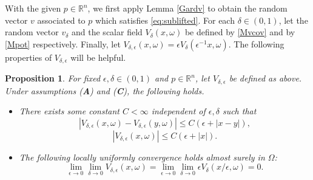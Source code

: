 \documentclass[11pt,reqno]{amsart}
\newtheorem{prop}[thm]{Proposition}
\theoremstyle{definition}
\theoremstyle{remark}
\numberwithin{equation}{section}
\newcommand{\eps}{\epsilon}
\newcommand{\R}{{\mathbb{R}}}
\begin{document}
With the given $p\in \R^n$, we first apply Lemma \ref{Gardv} to obtain the random vector $v$ associated to $p$ which satisfies \eqref{eq:sublifted}. For each $\delta \in (0,1)$, let the random vector $v_\delta$ and the scalar field $V_\delta(x,\omega)$ be defined by \eqref{Mvcov} and by \eqref{Mpot} respectively. Finally, let $V_{\delta,\epsilon}(x,\omega)= \epsilon V_{\delta}(\epsilon^{-1}x, \omega)$. The following properties of $V_{\delta,\eps}$ will be helpful.

\begin{prop} For fixed $\eps,\delta \in (0,1)$ and $p\in \R^n$, let $V_{\delta,\eps}$ be defined as above. Under assumptions {\upshape ({\bf A})} and {\upshape ({\bf C})}, the following holds.
\begin{itemize}
\item[(1)] There exists some constant $C < \infty$ independent of $\eps,\delta$ such that 
\begin{equation}
\label{eq:lip-C}
|V_{\delta,\epsilon}(x,\omega)
-V_{\delta,\epsilon}(y,\omega)| 
\le C(\epsilon+|x-y|),
\end{equation}
\begin{equation}\label{eq:Vlinear-C}
    |V_{\delta,\epsilon}(x,\omega)|\leq C(\epsilon+|x|).
\end{equation}
\item[(2)] The following locally uniformly convergence holds almost surely in $\Omega$:
\begin{equation}
\label{eq:erg-delta}
    \lim_{\epsilon\to 0}\lim_{\delta\to 0}V_{\delta,\epsilon}(x,\omega) = \lim_{\epsilon\to 0}\lim_{\delta\to 0}\epsilon V_{\delta}(x/\epsilon,\omega)= 0. 
\end{equation}
\end{itemize}
\end{prop}
\end{document}
